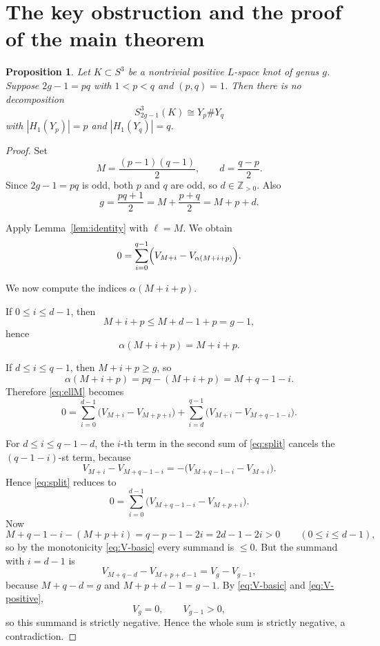 \documentclass[11pt]{article}
\newtheorem{proposition}[theorem]{Proposition}
\begin{document}
\section{The key obstruction and the proof of the main theorem}

\begin{proposition}\label{prop:key}
Let \(K\subset S^{3}\) be a nontrivial positive \(L\)-space knot of genus \(g\).
Suppose \(2g-1=pq\) with \(1<p<q\) and \((p,q)=1\).
Then there is no decomposition
\[
S^{3}_{2g-1}(K)\cong Y_{p}\# Y_{q}
\]
with \(|H_{1}(Y_{p})|=p\) and \(|H_{1}(Y_{q})|=q\).
\end{proposition}

\begin{proof}
Set
\[
M=\frac{(p-1)(q-1)}{2},
\qquad
d=\frac{q-p}{2}.
\]
Since \(2g-1=pq\) is odd, both \(p\) and \(q\) are odd, so \(d\in \mathbb{Z}_{>0}\).
Also
\[
g=\frac{pq+1}{2}=M+\frac{p+q}{2}=M+p+d.
\]

Apply Lemma~\ref{lem:identity} with \(\ell=M\).  We obtain
\begin{equation}\label{eq:ellM}
0=\sum_{i=0}^{q-1}\Bigl(V_{M+i}-V_{\alpha(M+i+p)}\Bigr).
\end{equation}

We now compute the indices \(\alpha(M+i+p)\).

If \(0\le i\le d-1\), then
\[
M+i+p\le M+d-1+p=g-1,
\]
hence
\[
\alpha(M+i+p)=M+i+p.
\]

If \(d\le i\le q-1\), then \(M+i+p\ge g\), so
\[
\alpha(M+i+p)=pq-(M+i+p)=M+q-1-i.
\]
Therefore \eqref{eq:ellM} becomes
\begin{equation}\label{eq:split}
0=
\sum_{i=0}^{d-1}\bigl(V_{M+i}-V_{M+p+i}\bigr)
+
\sum_{i=d}^{q-1}\bigl(V_{M+i}-V_{M+q-1-i}\bigr).
\end{equation}

For \(d\le i\le q-1-d\), the \(i\)-th term in the second sum of \eqref{eq:split}
cancels the \((q-1-i)\)-st term, because
\[
V_{M+i}-V_{M+q-1-i}= -\bigl(V_{M+q-1-i}-V_{M+i}\bigr).
\]
Hence \eqref{eq:split} reduces to
\[
0=\sum_{i=0}^{d-1}\bigl(V_{M+q-1-i}-V_{M+p+i}\bigr).
\]
Now
\[
M+q-1-i-(M+p+i)=q-p-1-2i=2d-1-2i>0
\qquad (0\le i\le d-1),
\]
so by the monotonicity \eqref{eq:V-basic} every summand is \(\le 0\).
But the summand with \(i=d-1\) is
\[
V_{M+q-d}-V_{M+p+d-1}=V_{g}-V_{g-1},
\]
because \(M+q-d=g\) and \(M+p+d-1=g-1\).
By \eqref{eq:V-basic} and \eqref{eq:V-positive},
\[
V_{g}=0,\qquad V_{g-1}>0,
\]
so this summand is strictly negative.
Hence the whole sum is strictly negative, a contradiction.
\end{proof}
\end{document}
